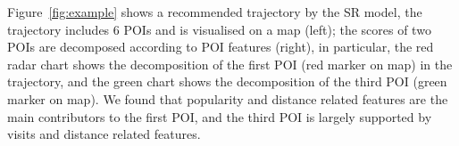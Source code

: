 Figure~\ref{fig:example} shows a recommended trajectory by the SR model, 
the trajectory includes 6 POIs and is visualised on a map (left);
the scores of two POIs are decomposed according to POI features (right),
in particular, the red radar chart shows the decomposition of the first POI (red marker on map) in the trajectory,
and the green chart shows the decomposition of the third POI (green marker on map).
We found that popularity and distance related features are the main contributors to the first POI,
and the third POI is largely supported by visits and distance related features.





